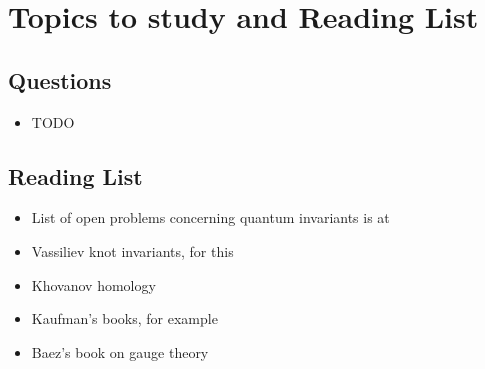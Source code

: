 \chapter{Topics to study and Reading List}

\section{Questions}

\begin{itemize}
	\item TODO
\end{itemize}


\section{Reading List}

\begin{itemize}
	\item List of open problems concerning quantum invariants
		is at
		\citep{ohtsuki2002problems}
		
	\item Vassiliev knot invariants, for this
		\citep{bar1995vassiliev}
		
	\item Khovanov homology
		\citep{bar2005khovanov}
	
	\item Kaufman's books, for example
		\citep{kauffman2001knots}
		
	\item Baez's book on gauge theory
		\citep{baez1994gauge}
\end{itemize}